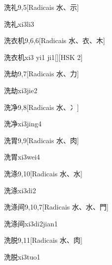 \begin{entry}{洗礼}{9,5}[Radicais ⽔、⽰]
  \begin{phonetics}{洗礼}{xi3li3}
  \end{phonetics}
\end{entry}

\begin{entry}{洗衣机}{9,6,6}[Radicais ⽔、⾐、⽊]
  \begin{phonetics}{洗衣机}{xi3 yi1 ji1}[][HSK 2]
  \end{phonetics}
\end{entry}

\begin{entry}{洗劫}{9,7}[Radicais ⽔、⼒]
  \begin{phonetics}{洗劫}{xi3jie2}
  \end{phonetics}
\end{entry}

\begin{entry}{洗净}{9,8}[Radicais ⽔、⼎]
  \begin{phonetics}{洗净}{xi3jing4}
  \end{phonetics}
\end{entry}

\begin{entry}{洗胃}{9,9}[Radicais ⽔、⾁]
  \begin{phonetics}{洗胃}{xi3wei4}
  \end{phonetics}
\end{entry}

\begin{entry}{洗涤}{9,10}[Radicais ⽔、⽔]
  \begin{phonetics}{洗涤}{xi3di2}
  \end{phonetics}
\end{entry}

\begin{entry}{洗涤间}{9,10,7}[Radicais ⽔、⽔、⾨]
  \begin{phonetics}{洗涤间}{xi3di2jian1}
  \end{phonetics}
\end{entry}

\begin{entry}{洗脱}{9,11}[Radicais ⽔、⾁]
  \begin{phonetics}{洗脱}{xi3tuo1}
  \end{phonetics}
\end{entry}

